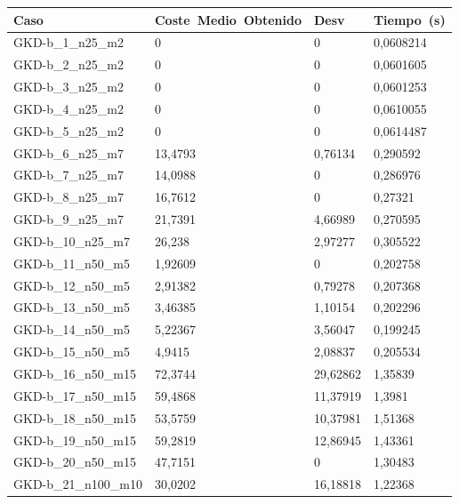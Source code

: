 \pagebreak

\begin{table}[!ht]%
    \centering    
    \begin{adjustbox}{height=12cm}
    \begin{tabular}{|l|l|l|l|}
    \hline
        Caso & Coste~Medio~Obtenido & Desv & Tiempo~(s) \\ \hline
		GKD-b\_1\_n25\_m2    & 0       & 0         & 0,0608214 \\ \hline
		GKD-b\_2\_n25\_m2    & 0       & 0         & 0,0601605 \\ \hline
		GKD-b\_3\_n25\_m2    & 0       & 0         & 0,0601253 \\ \hline
		GKD-b\_4\_n25\_m2    & 0       & 0         & 0,0610055 \\ \hline
		GKD-b\_5\_n25\_m2    & 0       & 0         & 0,0614487 \\ \hline
		GKD-b\_6\_n25\_m7    & 13,4793 & 0,76134   & 0,290592  \\ \hline
		GKD-b\_7\_n25\_m7    & 14,0988 & 0     & 0,286976  \\ \hline
		GKD-b\_8\_n25\_m7    & 16,7612 & 0     & 0,27321   \\ \hline
		GKD-b\_9\_n25\_m7    & 21,7391 & 4,66989   & 0,270595  \\ \hline
		GKD-b\_10\_n25\_m7   & 26,238  & 2,97277   & 0,305522  \\ \hline
		GKD-b\_11\_n50\_m5   & 1,92609 & 0    & 0,202758  \\ \hline
		GKD-b\_12\_n50\_m5   & 2,91382 & 0,79278   & 0,207368  \\ \hline
		GKD-b\_13\_n50\_m5   & 3,46385 & 1,10154   & 0,202296  \\ \hline
		GKD-b\_14\_n50\_m5   & 5,22367 & 3,56047   & 0,199245  \\ \hline
		GKD-b\_15\_n50\_m5   & 4,9415  & 2,08837   & 0,205534  \\ \hline
		GKD-b\_16\_n50\_m15  & 72,3744 & 29,62862  & 1,35839   \\ \hline
		GKD-b\_17\_n50\_m15  & 59,4868 & 11,37919  & 1,3981    \\ \hline
		GKD-b\_18\_n50\_m15  & 53,5759 & 10,37981  & 1,51368   \\ \hline
		GKD-b\_19\_n50\_m15  & 59,2819 & 12,86945  & 1,43361   \\ \hline
		GKD-b\_20\_n50\_m15  & 47,7151 & 0    & 1,30483   \\ \hline
		GKD-b\_21\_n100\_m10 & 30,0202 & 16,18818  & 1,22368   \\ \hline

\end{tabular}
\end{adjustbox}
\end{table}
